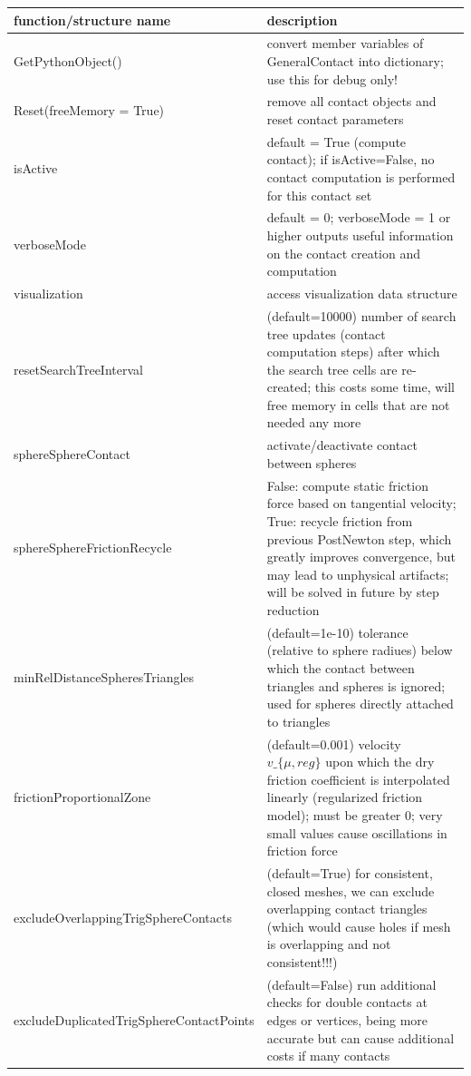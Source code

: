 \begin{center}
\footnotesize
\begin{longtable}{| p{8cm} | p{8cm} |} 
\hline
{\bf function/structure name} & {\bf description}\\ \hline
  GetPythonObject() & convert member variables of GeneralContact into dictionary; use this for debug only!\\ \hline 
  Reset(freeMemory = True) & remove all contact objects and reset contact parameters\\ \hline 
  isActive & default = True (compute contact); if isActive=False, no contact computation is performed for this contact set \\ \hline  
  verboseMode & default = 0; verboseMode = 1 or higher outputs useful information on the contact creation and computation \\ \hline  
  visualization & access visualization data structure \\ \hline  
  resetSearchTreeInterval & (default=10000) number of search tree updates (contact computation steps) after which the search tree cells are re-created; this costs some time, will free memory in cells that are not needed any more \\ \hline  
  sphereSphereContact & activate/deactivate contact between spheres \\ \hline  
  sphereSphereFrictionRecycle & False: compute static friction force based on tangential velocity; True: recycle friction from previous PostNewton step, which greatly improves convergence, but may lead to unphysical artifacts; will be solved in future by step reduction \\ \hline  
  minRelDistanceSpheresTriangles & (default=1e-10) tolerance (relative to sphere radiues) below which the contact between triangles and spheres is ignored; used for spheres directly attached to triangles \\ \hline  
  frictionProportionalZone & (default=0.001) velocity $v\_\{\mu,reg\}$ upon which the dry friction coefficient is interpolated linearly (regularized friction model); must be greater 0; very small values cause oscillations in friction force \\ \hline  
  excludeOverlappingTrigSphereContacts & (default=True) for consistent, closed meshes, we can exclude overlapping contact triangles (which would cause holes if mesh is overlapping and not consistent!!!) \\ \hline  
  excludeDuplicatedTrigSphereContactPoints & (default=False) run additional checks for double contacts at edges or vertices, being more accurate but can cause additional costs if many contacts \\ \hline  

\end{longtable}
\end{center}

